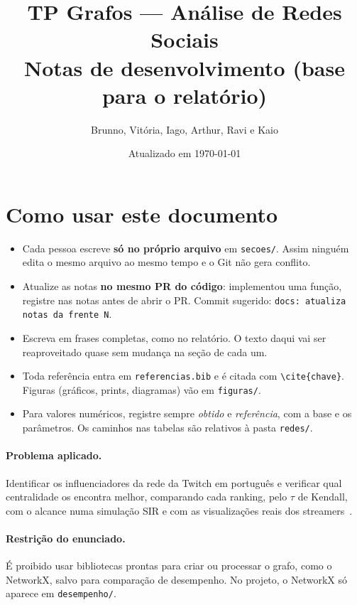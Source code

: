 \documentclass[11pt,a4paper]{article}
\title{TP Grafos --- Análise de Redes Sociais\\[2pt]
       \large Notas de desenvolvimento (base para o relatório)}
\author{Brunno, Vitória, Iago, Arthur, Ravi e Kaio}
\date{Atualizado em \today}
\newcommand{\codigo}[1]{\texttt{#1}}
\begin{document}
\maketitle

\section*{Como usar este documento}

\begin{itemize}[leftmargin=*]
  \item Cada pessoa escreve \textbf{só no próprio arquivo} em \codigo{secoes/}. Assim ninguém
        edita o mesmo arquivo ao mesmo tempo e o Git não gera conflito.
  \item Atualize as notas \textbf{no mesmo PR do código}: implementou uma função, registre nas
        notas antes de abrir o PR. Commit sugerido: \codigo{docs: atualiza notas da frente N}.
  \item Escreva em frases completas, como no relatório. O texto daqui vai ser reaproveitado quase
        sem mudança na seção de cada um.
  \item Toda referência entra em \codigo{referencias.bib} e é citada com \codigo{\textbackslash cite\{chave\}}.
        Figuras (gráficos, prints, diagramas) vão em \codigo{figuras/}.
  \item Para valores numéricos, registre sempre \emph{obtido} e \emph{referência}, com a base e os parâmetros.
        Os caminhos nas tabelas são relativos à pasta \codigo{redes/}.
\end{itemize}

\paragraph{Problema aplicado.} Identificar os influenciadores da rede da Twitch em português e
verificar qual centralidade os encontra melhor, comparando cada ranking, pelo $\tau$ de Kendall,
com o alcance numa simulação SIR e com as visualizações reais dos streamers~\cite{kitsak2010}.

\paragraph{Restrição do enunciado.} É proibido usar bibliotecas prontas para criar ou processar o
grafo, como o NetworkX, salvo para comparação de desempenho. No projeto, o NetworkX só aparece em
\codigo{desempenho/}.










\end{document}
